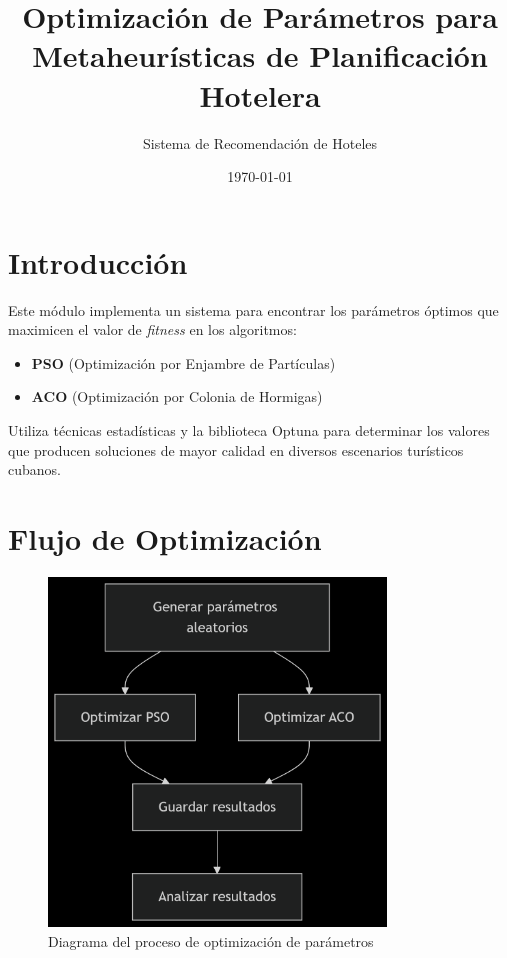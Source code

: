 \documentclass{article}
\title{Optimización de Parámetros para Metaheurísticas de Planificación Hotelera}
\author{Sistema de Recomendación de Hoteles}
\date{\today}
\begin{document}
\maketitle

\section{Introducción}
Este módulo implementa un sistema para encontrar los parámetros óptimos que maximicen el valor de \textit{fitness} en los algoritmos:
\begin{itemize}
    \item \textbf{PSO} (Optimización por Enjambre de Partículas)
    \item \textbf{ACO} (Optimización por Colonia de Hormigas)
\end{itemize}

Utiliza técnicas estadísticas y la biblioteca Optuna para determinar los valores que producen soluciones de mayor calidad en diversos escenarios turísticos cubanos.

\section{Flujo de Optimización}
\begin{figure}[h]
\centering
\includegraphics[width=0.8\textwidth]{optimization_flow.png}
\caption{Diagrama del proceso de optimización de parámetros}
\label{fig:flow}
\end{figure}
\end{document}
